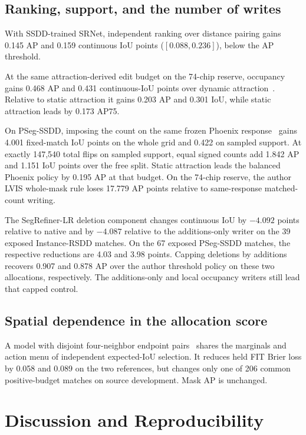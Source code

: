 \subsection{Ranking, support, and the number of writes}
With SSDD-trained SRNet, independent ranking over distance pairing gains 0.145 AP and 0.159 continuous IoU points (\([0.088,0.236]\)), below the AP threshold.


At the same attraction-derived edit budget on the 74-chip reserve, occupancy gains 0.468 AP and 0.431 continuous-IoU points over dynamic attraction~\cite{atkinson}. Relative to static attraction it gains 0.203 AP and 0.301 IoU, while static attraction leads by 0.173 AP75.

On PSeg-SSDD, imposing the count on the same frozen Phoenix response~\cite{phoenix} gains 4.001 fixed-match IoU points on the whole grid and 0.422 on sampled support. At exactly 147,540 total flips on sampled support, equal signed counts add 1.842 AP and 1.151 IoU points over the free split. Static attraction leads the balanced Phoenix policy by 0.195 AP at that budget. On the 74-chip reserve, the author LVIS whole-mask rule loses 17.779 AP points relative to same-response matched-count writing.

The SegRefiner-LR deletion component changes continuous IoU by \(-4.092\) points relative to native and by \(-4.087\) relative to the additions-only writer on the 39 exposed Instance-RSDD matches. On the 67 exposed PSeg-SSDD matches, the respective reductions are 4.03 and 3.98 points. Capping deletions by additions recovers 0.907 and 0.878 AP over the author threshold policy on these two allocations, respectively. The additions-only and local occupancy writers still lead that capped control.

\subsection{Spatial dependence in the allocation score}

A model with disjoint four-neighbor endpoint pairs~\cite{rankdep} shares the marginals and action menu of independent expected-IoU selection. It reduces held FIT Brier loss by 0.058 and 0.089 on the two references, but changes only one of 206 common positive-budget matches on source development. Mask AP is unchanged.

\section{Discussion and Reproducibility}
\label{sec:discussion}

